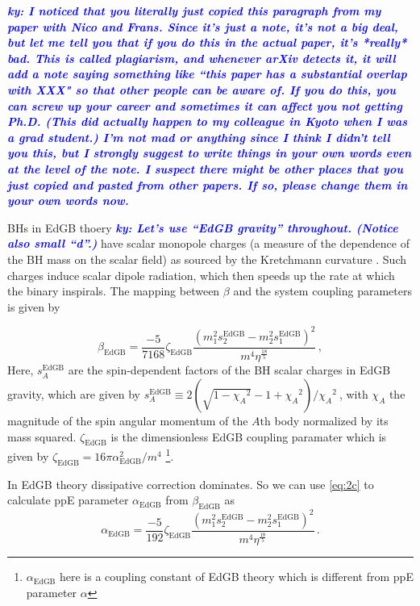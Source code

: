 \documentclass[prd,twocolumn,nofootinbib]{revtex4-1}
\newcommand{\ky}[1]{\textcolor{blue}{\it{\textbf{ky: #1}}} }
\begin{document}
\ky{I noticed that you literally just copied this paragraph from my paper with Nico and Frans. Since it's just a note, it's not a big deal, but let me tell you that if you do this in the actual paper, it's *really* bad. This is called plagiarism, and whenever arXiv detects it, it will add a note saying something like ``this paper has a substantial overlap with XXX" so that other people can be aware of. If you do this, you can screw up your career and sometimes it can affect you not getting Ph.D. (This did actually happen to my colleague in Kyoto when I was a grad student.) I'm not mad or anything since I think I didn't tell you this, but I strongly suggest to write things in your own words even at the level of the note. I suspect there might be other places that you just copied and pasted from other papers. If so, please change them in your own words now.}
  
 BHs in EdGB thoery  \ky{Let's use ``EdGB gravity'' throughout. (Notice also small ``d''.)} have scalar monopole charges (a measure of the dependence of the BH mass on the scalar field) as sourced by the Kretchmann curvature \cite{Yunes:2016jcc}. Such charges induce scalar dipole radiation, which then speeds up the rate at which the binary inspirals. The mapping between $\beta$ and the system coupling parameters is given by \cite{Yunes:2016jcc,Yagi:2011xp}
 
 \begin{equation}
 \beta_{\text{EdGB}}=\frac{-5}{7168}\zeta_{\text{EdGB}}\frac{(m_1^2s_2^{\text{EdGB}}-m_2^2s_1^{\text{EdGB}})^2}{m^4\eta^{\frac{18}{5}}}\,,
 \end{equation}
 Here, $s_{A}^{\text{EdGB}}$ are the spin-dependent factors of the BH scalar charges in EdGB gravity, which are given by $s_{A}^{\text{EdGB}}\equiv 2(\sqrt{1-{\chi_A}^2}-1+{\chi_A}^2)/{\chi_A}^2~$\cite{Berti:2018cxi,Prabhu:2018aun}, with $\chi_A$ the magnitude of the spin angular momentum of the $\mathit{A}\text{th}$ body normalized by its mass squared. $\zeta_{\text{EdGB}}$ is the dimensionless EdGB coupling paramater which is given by $\zeta_{\text{EdGB}}=16 \pi \alpha_{\text{EdGB}}^2/m^4$ \footnote{$\alpha_{\text{EdGB}}$ here  is a coupling constant of EdGB theory which is different from ppE parameter $\alpha$}.


 \hspace{15.5pt} In EdGB theory dissipative correction dominates. So we can use \eqref{eq:2c} to calculate ppE parameter $\alpha_{\text{EdGB}}$ from $\beta_{\text{EdGB}}$ as  
 \begin{equation}
 \alpha_{\text{EdGB}}=\frac{-5}{192}\zeta_{\text{EdGB}}\frac{(m_1^2s_2^{\text{EdGB}}-m_2^2s_1^{\text{EdGB}})^2}{m^4\eta^{\frac{18}{5}}}\,.
 \end{equation}
 
\end{document}
